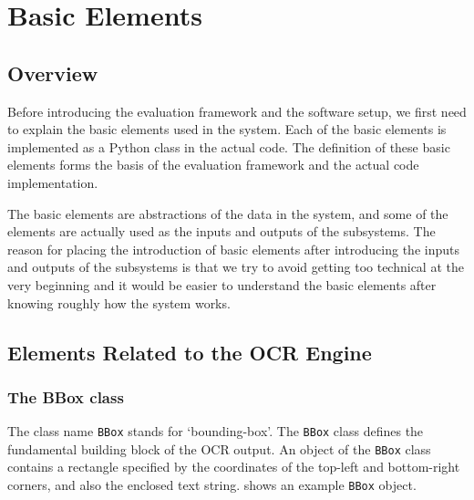 
\chapter{Basic Elements}

\ifpdf
    \graphicspath{{Chapter6/Figs/Raster/}{Chapter6/Figs/PDF/}{Chapter6/Figs/}}
\else
    \graphicspath{{Chapter6/Figs/Vector/}{Chapter6/Figs/}}
\fi


\section{Overview}

Before introducing the evaluation framework and the software setup, we first need to explain the basic elements used in the system. Each of the basic elements is implemented as a Python class in the actual code. The definition of these basic elements forms the basis of the evaluation framework and the actual code implementation.

The basic elements are abstractions of the data in the system, and some of the elements are actually used as the inputs and outputs of the subsystems. The reason for placing the introduction of basic elements after introducing the inputs and outputs of the subsystems is that we try to avoid getting too technical at the very beginning and it would be easier to understand the basic elements after knowing roughly how the system works. 

\section{Elements Related to the OCR Engine}

\subsection{The BBox class}

The class name \texttt{BBox} stands for `bounding-box'. The \texttt{BBox} class defines the fundamental building block of the OCR output. An object of the \texttt{BBox} class contains a rectangle specified by the coordinates of the top-left and bottom-right corners, and also the enclosed text string.  shows an example \texttt{BBox} object. 

